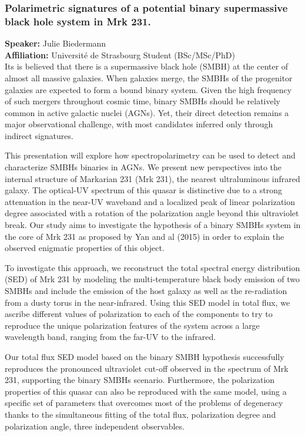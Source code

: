\subsubsection*{Polarimetric signatures of a potential binary supermassive black hole system in Mrk 231.}
\textbf{Speaker:} Julie Biedermann \\
\textbf{Affiliation:} Université de Strasbourg \textperiodcentered{} Student (BSc/MSc/PhD)\\
Its is believed that there is a supermassive black hole (SMBH) at the center of almost all massive galaxies. When galaxies merge, the SMBHs of the progenitor galaxies are expected to form a bound binary system. Given the high frequency of such mergers throughout cosmic time, binary SMBHs should be relatively common in active galactic nuclei (AGNs). Yet, their direct detection remains a major observational challenge, with most candidates inferred only through indirect signatures.

This presentation will explore how spectropolarimetry can be used to detect and characterize SMBHs binaries in AGNs. We present new perspectives into the internal structure of Markarian 231 (Mrk 231), the nearest ultraluminous infrared galaxy. The optical-UV spectrum of this quasar is distinctive due to a strong attenuation in the near-UV waveband and a localized peak of linear polarization degree associated with a rotation of the polarization angle beyond this ultraviolet break. Our study aims to investigate the hypothesis of a binary SMBHs system in the core of Mrk 231 as proposed by Yan and al (2015) in order to explain the observed enigmatic properties of this object.

To investigate this approach, we reconstruct the total spectral energy distribution (SED) of Mrk 231 by modeling the multi-temperature black body emission of two SMBHs and include the emission of the host galaxy as well as the re-radiation from a dusty torus in the near-infrared. Using this SED model in total flux, we ascribe different values of polarization to each of the components to try to reproduce the unique polarization features of the system across a large wavelength band, ranging from the far-UV to the infrared.

Our total flux SED model based on the binary SMBH hypothesis successfully reproduces the pronounced ultraviolet cut-off observed in the spectrum of Mrk 231, supporting the binary SMBHs scenario. Furthermore, the polarization properties of this quasar can also be reproduced with the same model, using a specific set of parameters that overcomes most of the problems of degeneracy thanks to the simultaneous fitting of the total flux, polarization degree and polarization angle, three independent observables.

